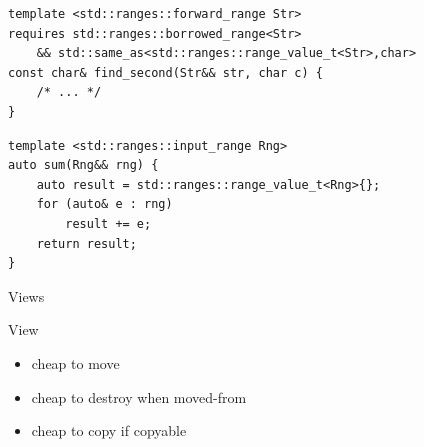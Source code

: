 \documentclass[aspectratio=169]{beamer}
\begin{document}
\begin{frame}[fragile]
\begin{verbatim}
template <std::ranges::forward_range Str>
requires std::ranges::borrowed_range<Str> 
    && std::same_as<std::ranges::range_value_t<Str>,char>
const char& find_second(Str&& str, char c) {
    /* ... */
}
\end{verbatim}
\let\thefootnote\relax{}
\end{frame}

\begin{frame}[fragile,c]
    \large
    \begin{center}
        \begin{verbatim}
template <std::ranges::input_range Rng>
auto sum(Rng&& rng) {
    auto result = std::ranges::range_value_t<Rng>{};
    for (auto& e : rng)
        result += e;
    return result;
}
        \end{verbatim}
    \end{center}
\end{frame}


\begin{frame}[c]
    \Huge
    \begin{center}
        Views
    \end{center}
\end{frame}

{ 
\begin{frame}
\end{frame}}

\begin{frame}{View}
    \begin{itemize}
        \item cheap to move
        \item cheap to destroy when moved-from
        \item cheap to copy if copyable
    \end{itemize}
\end{frame}
\end{document}
